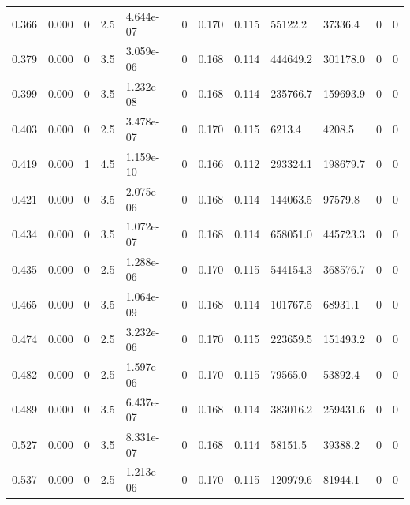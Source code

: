 \documentclass[preview]{standalone}
\begin{document}
{{\begin{tabular}{L{1.2cm}C{1.2cm} C{0.3cm}C{0.5cm} C{1.4cm}C{1.4cm} C{1.4cm}C{1.4cm} C{1.6cm}C{1.6cm} C{1.6cm}C{1.6cm}}
  0.366  &  0.000  & 0     & 2.5 &  4.644e-07  & 0  &  0.170&   0.115& 55122.2 & 37336.4   &  0 & 0  \\ 
  0.379  &  0.000  & 0     & 3.5 &  3.059e-06  & 0  &  0.168&   0.114& 444649.2 & 301178.0   &  0 & 0  \\ 
  0.399  &  0.000  & 0     & 3.5 &  1.232e-08  & 0  &  0.168&   0.114& 235766.7 & 159693.9   &  0 & 0  \\ 
  0.403  &  0.000  & 0     & 2.5 &  3.478e-07  & 0  &  0.170&   0.115& 6213.4 & 4208.5   &  0 & 0  \\ 
  0.419  &  0.000  & 1     & 4.5 &  1.159e-10  & 0  &  0.166&   0.112& 293324.1 & 198679.7   &  0 & 0  \\ 
  0.421  &  0.000  & 0     & 3.5 &  2.075e-06  & 0  &  0.168&   0.114& 144063.5 & 97579.8   &  0 & 0  \\ 
  0.434  &  0.000  & 0     & 3.5 &  1.072e-07  & 0  &  0.168&   0.114& 658051.0 & 445723.3   &  0 & 0  \\ 
  0.435  &  0.000  & 0     & 2.5 &  1.288e-06  & 0  &  0.170&   0.115& 544154.3 & 368576.7   &  0 & 0  \\ 
  0.465  &  0.000  & 0     & 3.5 &  1.064e-09  & 0  &  0.168&   0.114& 101767.5 & 68931.1   &  0 & 0  \\ 
  0.474  &  0.000  & 0     & 2.5 &  3.232e-06  & 0  &  0.170&   0.115& 223659.5 & 151493.2   &  0 & 0  \\ 
  0.482  &  0.000  & 0     & 2.5 &  1.597e-06  & 0  &  0.170&   0.115& 79565.0 & 53892.4   &  0 & 0  \\ 
  0.489  &  0.000  & 0     & 3.5 &  6.437e-07  & 0  &  0.168&   0.114& 383016.2 & 259431.6   &  0 & 0  \\ 
  0.527  &  0.000  & 0     & 3.5 &  8.331e-07  & 0  &  0.168&   0.114& 58151.5 & 39388.2   &  0 & 0  \\ 
  0.537  &  0.000  & 0     & 2.5 &  1.213e-06  & 0  &  0.170&   0.115& 120979.6 & 81944.1   &  0 & 0  \\ 
\hline 
\end{tabular} 

}}
\end{document}
